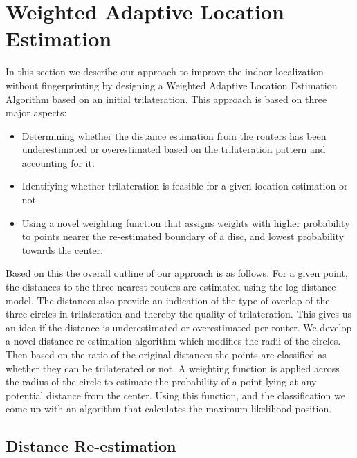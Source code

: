 \documentclass[twocolumn, 11pt]{IEEEtran}
\begin{document}
\section{Weighted Adaptive Location Estimation }

In this section we describe our approach to improve the indoor localization without fingerprinting by designing a Weighted Adaptive Location Estimation Algorithm based on an initial trilateration. This approach is based on three major aspects:
\begin{itemize}
\item Determining whether the distance estimation from the routers has been underestimated or overestimated based on the trilateration pattern and accounting for it. 

\item Identifying whether trilateration is feasible for a given location estimation or not

\item Using a novel weighting function that assigns weights with higher probability to points nearer the re-estimated boundary of a disc, and lowest probability towards the center. 
\end{itemize}

Based on this the overall outline of our approach is as follows. For a given point, the distances to the three nearest routers are estimated using the log-distance model. The distances also provide an indication of the type of overlap of the three circles in trilateration and thereby the quality of trilateration. This gives us an idea if the distance is underestimated or overestimated per router. We develop a novel distance re-estimation algorithm which modifies the radii of the circles. Then based on the ratio of the original distances the points are classified as whether they can be trilaterated or not.  A weighting function is applied across the radius of the circle to estimate the probability of a point lying at any potential distance from the center. Using this function, and the classification we come up with an algorithm that calculates the maximum likelihood position. 

\subsection{Distance Re-estimation}
\end{document}
